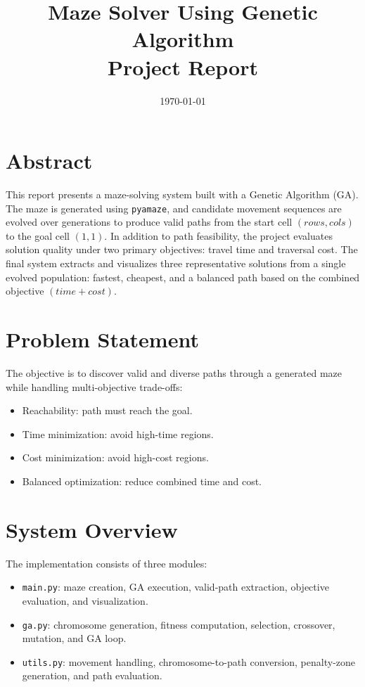 \documentclass[12pt]{article}
\title{Maze Solver Using Genetic Algorithm\\Project Report}
\author{}
\date{\today}
\begin{document}
\maketitle
\onehalfspacing

\section*{Abstract}
This report presents a maze-solving system built with a Genetic Algorithm (GA). The maze is generated using \texttt{pyamaze}, and candidate movement sequences are evolved over generations to produce valid paths from the start cell \((rows, cols)\) to the goal cell \((1,1)\). In addition to path feasibility, the project evaluates solution quality under two primary objectives: travel time and traversal cost. The final system extracts and visualizes three representative solutions from a single evolved population: fastest, cheapest, and a balanced path based on the combined objective \((time + cost)\).

\section{Problem Statement}
The objective is to discover valid and diverse paths through a generated maze while handling multi-objective trade-offs:
\begin{itemize}
    \item Reachability: path must reach the goal.
    \item Time minimization: avoid high-time regions.
    \item Cost minimization: avoid high-cost regions.
    \item Balanced optimization: reduce combined time and cost.
\end{itemize}

\section{System Overview}
The implementation consists of three modules:
\begin{itemize}
    \item \texttt{main.py}: maze creation, GA execution, valid-path extraction, objective evaluation, and visualization.
    \item \texttt{ga.py}: chromosome generation, fitness computation, selection, crossover, mutation, and GA loop.
    \item \texttt{utils.py}: movement handling, chromosome-to-path conversion, penalty-zone generation, and path evaluation.
\end{itemize}
\end{document}
